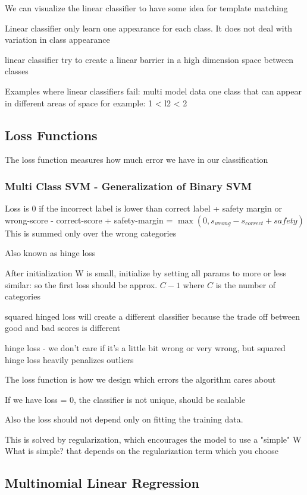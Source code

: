 We can visualize the linear classifier to have some idea for template matching

Linear classifier only learn one appearance for each class. It does not deal with variation in class appearance

linear classifier try to create a linear barrier in a high dimension space between classes	

Examples where linear classifiers fail:
multi model data
one class that can appear in different areas of space
for example: 1 < l2 < 2


\subsection{Loss Functions}

The loss function measures how much error we have in our classification

\subsubsection{Multi Class SVM - Generalization of Binary SVM }

Loss is 0 if the incorrect label is lower than correct label + safety margin
or wrong-score - correct-score + safety-margin = $\max(0, s_{wrong} - s_{correct} + safety)$
This is summed only over the wrong categories

Also known as hinge loss

After initialization W is small, initialize by setting all params to more or less similar: 
so the first loss should be approx. $C-1$ where $C$ is the number of categories

squared hinged loss will create a different classifier because the trade off between good and bad scores is different

hinge loss - we don't care if it's a little bit wrong or very wrong, but squared hinge loss heavily penalizes outliers

The loss function is how we design which errors the algorithm cares about

If we have loss = 0, the classifier is not unique, should be scalable 

Also the loss should not depend only on fitting the training data.

This is solved by regularization, which encourages the model to use a "simple" W
What is simple? that depends on the regularization term which you choose

\subsection{Multinomial Linear Regression}

